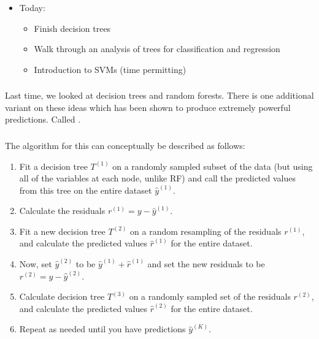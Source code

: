\documentclass[xetex,mathserif,serif,aspectratio=169]{beamer}
\begin{document}
\begin{frame}[fragile] \frametitle{} \oldB \small

\begin{itemize}
\item Today:
\begin{itemize}
\item Finish decision trees
\item Walk through an analysis of trees for classification and regression
\item Introduction to SVMs (time permitting)
\end{itemize}
\end{itemize}

\end{frame}

\begin{frame}[fragile] \frametitle{} \oldB \small

\textbf{}

Last time, we looked at decision trees and random forests.
There is one additional variant on these ideas which has
been shown to produce extremely powerful predictions. Called
.


\end{frame}

\begin{frame}[fragile] \frametitle{} \oldB \small

\textbf{}

The algorithm for this can conceptually be described as follows:
\begin{enumerate}
\item Fit a decision tree $T^{(1)}$ on a randomly sampled subset of the data
(but using all of the variables at each node, unlike RF) and call the
predicted values from this tree on the entire dataset $\widehat{y}^{(1)}$. \pause
\item Calculate the residuals $r^{(1)} = y - \widehat{y}^{(1)}$. \pause
\item Fit a new decision tree $T^{(2)}$ on a random resampling of the residuals
$r^{(1)}$, and calculate the predicted values $\widehat{r}^{(1)}$ for the
entire dataset. \pause
\item Now, set $\widehat{y}^{(2)}$ to be $\widehat{y}^{(1)} + \widehat{r}^{(1)}$ and
set the new residuals to be $r^{(2)} = y - \widehat{y}^{(2)}$. \pause
\item Calculate decision tree $T^{(3)}$ on a randomly sampled set of the residuals $r^{(2)}$,
and calculate the predicted values $\widehat{r}^{(2)}$ for the entire dataset. \pause
\item Repeat as needed until you have predictions $\widehat{y}^{(K)}$.
\end{enumerate}

\end{frame}
\end{document}
